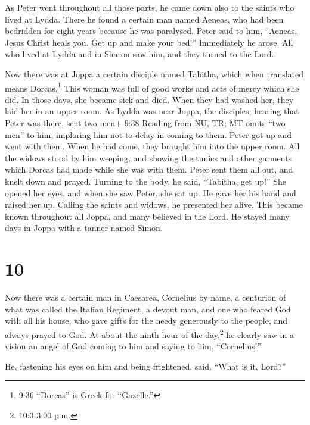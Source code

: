  As Peter went throughout all those parts, he came down
also to the saints who lived at Lydda.  There he found a
certain man named Aeneas, who had been bedridden for eight years because
he was paralysed.  Peter said to him, ``Aeneas, Jesus
Christ heals you. Get up and make your bed!'' Immediately he arose.
 All who lived at Lydda and in Sharon saw him, and they
turned to the Lord.

 Now there was at Joppa a certain disciple named Tabitha,
which when translated means Dorcas.\footnote{9:36 ``Dorcas'' is Greek
  for ``Gazelle.''} This woman was full of good works and acts of mercy
which she did.  In those days, she became sick and died.
When they had washed her, they laid her in an upper room. 
As Lydda was near Joppa, the disciples, hearing that Peter was there,
sent two men+ 9:38 Reading from NU, TR; MT omits ``two men'' to him,
imploring him not to delay in coming to them.  Peter got up
and went with them. When he had come, they brought him into the upper
room. All the widows stood by him weeping, and showing the tunics and
other garments which Dorcas had made while she was with them.
 Peter sent them all out, and knelt down and prayed.
Turning to the body, he said, ``Tabitha, get up!'' She opened her eyes,
and when she saw Peter, she sat up.  He gave her his hand
and raised her up. Calling the saints and widows, he presented her
alive.  This became known throughout all Joppa, and many
believed in the Lord.  He stayed many days in Joppa with a
tanner named Simon.

\hypertarget{section-9}{%
\section{10}\label{section-9}}

 Now there was a certain man in Caesarea, Cornelius by name,
a centurion of what was called the Italian Regiment,  a
devout man, and one who feared God with all his house, who gave gifts
for the needy generously to the people, and always prayed to God.
 At about the ninth hour of the day,\footnote{10:3 3:00 p.m.}
he clearly saw in a vision an angel of God coming to him and saying to
him, ``Cornelius!''

 He, fastening his eyes on him and being frightened, said,
``What is it, Lord?''

